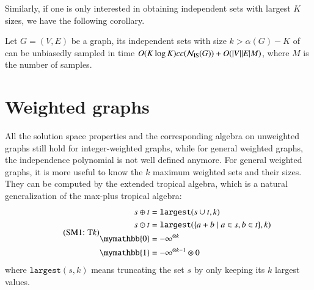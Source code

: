 \documentclass[review, onefignum, onetabnum]{siamart190516}
\begin{document}
Similarly, if one is only interested in obtaining independent sets with largest $K$ sizes, we have the following corollary.
\begin{corollary}
    Let $G = (V, E)$ be a graph, its independent sets with size $k > \alpha(G)-K$ of can be unbiasedly sampled in time $O(K\log K)cc({\mathcal{N}_{\rm IS}(G)}) + O(|V||E| M)$, where $M$ is the number of samples.
\end{corollary}

\section{Weighted graphs}\label{sec:weighted}

All the solution space properties and the corresponding algebra on unweighted graphs still hold for integer-weighted graphs, while for general weighted graphs, the independence polynomial is not well defined anymore.
For general weighted graphs, it is more useful to know the $k$ maximum weighted sets and their sizes.
They can be computed by the extended tropical algebra, which is a natural generalization of the max-plus tropical algebra:
\begin{equation}
\eqname{T$k$}
\begin{split}
    s \oplus t &= \texttt{largest}(s \cup t, k)\\
    s \odot t &= \texttt{largest}(\{a+b \mid a \in s, b\in t\}, k)\\
    \mymathbb{0} &= -\infty^{\otimes k}\\
    \mymathbb{1} &= -\infty^{\otimes k-1} \otimes 0
\end{split}\label{eq:ext-tropical}
\end{equation}
where $\texttt{largest}(s, k)$ means truncating the set $s$ by only keeping its $k$ largest values.
\end{document}
